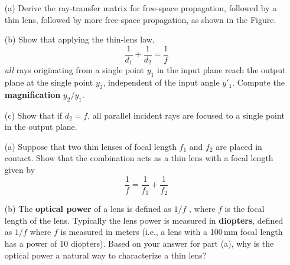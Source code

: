 \documentclass[11pt]{hmcpset}
\begin{document}
\begin{problem}
	\begin{itemize}
		\item[(a)] Derive the ray-transfer matrix for free-space propagation, followed by a thin lens, followed by more
	free-space propagation, as shown in the Figure.
		\item[(b)] Show that applying the thin-lens law,
		\[
		\frac{1}{d_1} + \frac{1}{d_2} = \frac{1}{f}
		\]
	\textit{all} rays originating from a single point $y_1$ in the input plane reach the output plane at the single point $y_2$, independent of the input angle $y'_1$. Compute the \textbf{magnification} $y_2/y_1$.
		\item[(c)] Show that if $d_2=f$, all parallel incident rays are focused to a single point in the output plane.
	\end{itemize}
\end{problem}

\begin{solution}
	
	\vfill
	
\end{solution}
	\pagebreak
\begin{problem}
	\begin{itemize}
		\item[(a)] Suppose that two thin lenses of focal length $f_1$ and $f_2$ are placed in contact. Show that the
		combination acts as a thin lens with a focal length given by
		\[
		\frac{1}{f} = \frac{1}{f_1} + \frac{1}{f_2}
		\]
		\item[(b)] The \textbf{optical power} of a lens is defined as $1/f$ , where $f$ is the focal length of the lens. Typically the lens power is measured in \textbf{diopters}, defined as $1/f$ where $f$ is measured in meters (i.e., a lens with a 100\,mm focal length has a power of 10 diopters). Based on your answer for part (a), why is the optical power a natural way to characterize a thin lens?
	\end{itemize}
\end{problem}
\end{document}
